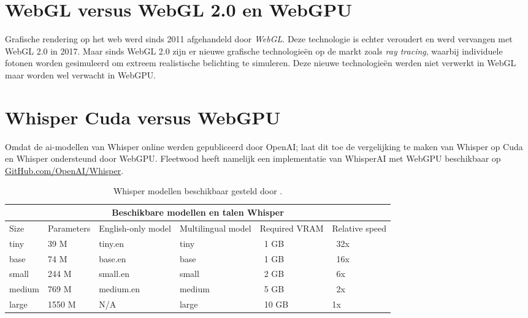 \section{WebGL versus WebGL 2.0 en WebGPU}

Grafische rendering op het web werd sinds 2011 afgehandeld door \textit{WebGL}. Deze technologie is echter veroudert en werd vervangen met WebGL 2.0 in 2017. Maar sinds WebGL 2.0 zijn er nieuwe grafische technologieën op de markt zoals \textit{ray tracing}, waarbij individuele fotonen worden gesimuleerd om extreem realistische belichting te simuleren. Deze nieuwe technologieën werden niet verwerkt in WebGL maar worden wel verwacht in WebGPU.

\break{}

\section{Whisper Cuda versus WebGPU}

Omdat de ai-modellen van Whisper online werden gepubliceerd door OpenAI; laat dit toe de vergelijking te maken van Whisper op Cuda en Whisper ondersteund door WebGPU. Fleetwood heeft namelijk een implementatie van WhisperAI met WebGPU beschikbaar op \href{https://github.com/openai/whisper}{GitHub.com/OpenAI/Whisper}.

\bigbreak{}
\begin{table}
    \begin{tabular}{ |p{1.5cm}|p{2.5cm}|p{3cm}|p{3cm}|p{2cm}|p{2cm}|  }
        \hline
        \multicolumn{6}{|c|}{Beschikbare modellen en talen Whisper} \\
        \hline
            Size& Parameters & English-only model & Multilingual model & Required VRAM & Relative speed\\
        \hline
            tiny&       39 M    &tiny.en    & tiny& ~1 GB& ~32x     \\
            base &      74 M	&base.en    & base & ~1 GB & ~16x   \\
            small &     244 M	&small.en   & small & ~2 GB & ~6x   \\
            medium &    769 M	&medium.en  & medium & ~5 GB & ~2x  \\
            large &     1550 M	&N/A        & large & ~10 GB& 	1x  \\
        \hline
    \end{tabular}
    \caption{Whisper modellen beschikbaar gesteld door \textcite{OpenAI2023}.}
    \label{tab:OpenAIWhisperModels}
\end{table}


